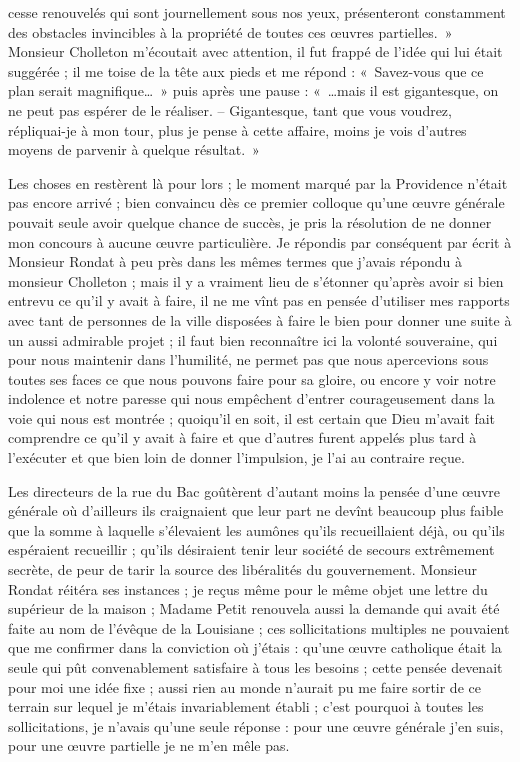 \documentclass[11pt,a4paper]{report}
\begin{document}
cesse renouvelés qui sont journellement sous nos yeux, présenteront constamment des obstacles invincibles à la propriété de toutes ces œuvres partielles.~» Monsieur Cholleton m'écoutait avec attention, il fut frappé de l'idée qui lui était suggérée ; il me toise de la tête aux pieds et me répond : «~Savez-vous que ce plan serait magnifique\dots~» puis après une pause : «~\dots mais il est gigantesque, on ne peut pas espérer de le réaliser.
-- Gigantesque, tant que vous voudrez, répliquai-je à mon tour, plus je pense à cette affaire, moins je vois d'autres moyens de parvenir à quelque résultat.~»

Les choses en restèrent là pour lors ; le moment marqué par la Providence n'était pas encore arrivé ; bien convaincu dès ce premier colloque qu'une œuvre générale pouvait seule avoir quelque chance de succès, je pris la résolution de ne donner mon concours à aucune œuvre particulière. Je répondis par conséquent par écrit à Monsieur Rondat à peu près dans les mêmes termes que j'avais répondu à monsieur Cholleton ; mais il y a vraiment lieu de s'étonner qu'après avoir si bien entrevu ce qu'il y avait à faire, il ne me vînt pas en pensée d'utiliser mes rapports avec tant de personnes de la ville disposées à faire le bien pour donner une suite à un aussi admirable projet ; il faut bien reconnaître ici la volonté souveraine, qui pour nous maintenir dans l'humilité, ne permet pas que nous apercevions sous toutes ses faces ce que nous pouvons faire pour sa gloire, ou encore y voir notre indolence et notre paresse qui nous empêchent d'entrer courageusement dans la voie qui nous est montrée ; quoiqu'il en soit, il est certain que Dieu m'avait fait comprendre ce qu'il y avait à faire et que d'autres furent appelés plus tard à l'exécuter et que bien loin de donner l'impulsion, je l'ai au contraire reçue.

Les directeurs de la rue du Bac goûtèrent d'autant moins la pensée d'une œuvre générale où d'ailleurs ils craignaient que leur part ne devînt beaucoup plus faible que la somme à laquelle s'élevaient les aumônes qu'ils recueillaient déjà, ou qu'ils espéraient recueillir ; qu'ils désiraient tenir leur société de secours extrêmement secrète, de peur de tarir la source des libéralités du gouvernement. Monsieur Rondat réitéra ses instances ; je reçus même pour le même objet une lettre du supérieur de la maison ; Madame Petit renouvela aussi la demande qui avait été faite au nom de l'évêque de la Louisiane ; ces sollicitations multiples ne pouvaient que me confirmer dans la conviction où j'étais : qu'une œuvre catholique était la seule qui pût convenablement satisfaire à tous les besoins ; cette pensée devenait pour moi une idée fixe ; aussi rien au monde n'aurait pu me faire sortir de ce terrain sur lequel je m'étais invariablement établi ; c'est pourquoi à toutes les sollicitations, je n'avais qu'une seule réponse : pour une œuvre générale j'en suis, pour une œuvre partielle je ne m'en mêle pas.
\end{document}
